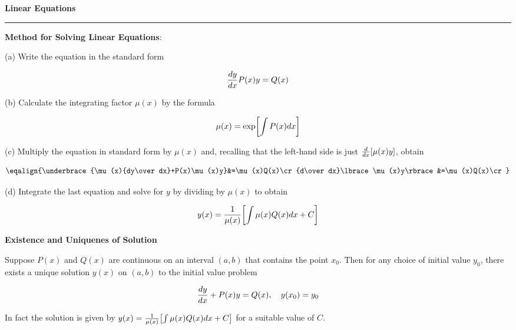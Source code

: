 \nopagenumbers
{\bf Linear Equations}
\vskip 1mm
\hrule

\vskip 6pt
{\bf Method for Solving Linear Equations}:

\vskip 6pt
(a) Write the equation in the standard form

$${dy\over dx}P(x)y=Q(x)$$

(b) Calculate the integrating factor $\mu(x)$ by the formula

$$\mu(x)=\hbox{exp}\biggl\lbrack\int P(x)dx\biggr\rbrack$$

(c) Multiply the equation in standard form by $\mu(x)$ and, recalling that the left-hand side is just ${d\over dx}\lbrack\mu(x)y\rbrack$, obtain

$$\eqalign{\underbrace{\mu(x){dy\over dx}+P(x)\mu(x)y}&=\mu(x)Q(x)\cr
			{d\over dx}\lbrace\mu(x)y\rbrace&=\mu(x)Q(x)\cr}$$

(d) Integrate the last equation and solve for $y$ by dividing by $\mu(x)$ to obtain

$$y(x)={1\over\mu(x)}\biggl\lbrack\int\mu(x)Q(x)dx+C\biggr\rbrack$$

\vskip 6pt
{\bf Existence and Uniquenes of Solution}

\vskip 6pt
Suppose $P(x)$ and $Q(x)$ are continuous on an interval $(a,b)$ that contains the point $x_0$. Then for any choice of initial value $y_0$, there exists a unique solution $y(x)$ on $(a,b)$ to the initial value problem

$${dy\over dx}+P(x)y=Q(x), \quad y(x_0)=y_0$$

In fact the solution is given by $y(x)={1\over\mu(x)}\bigl\lbrack\int\mu(x)Q(x)dx+C\bigr\rbrack$ for a suitable value of $C$.

\vfill\eject
\bye
